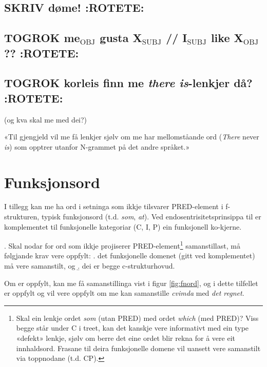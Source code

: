 \documentclass[11pt,a4paper,oneside,draft]{book}
\begin{document}
\subsection{\textbf{SKRIV} døme! \textbf{:ROTETE:}}
\label{sec-3.6.1}

\subsection{\textbf{TOGROK} me$_{\mathrm{OBJ}}$ gusta X$_{\mathrm{SUBJ}}$ // I$_{\mathrm{SUBJ}}$ like X$_{\mathrm{OBJ}}$ ?? \textbf{:ROTETE:}}
\label{sec-3.6.2}

\subsection{\textbf{TOGROK} korleis finn me \emph{there is}-lenkjer då? \textbf{:ROTETE:}}
\label{sec-3.6.3}

(og kva skal me med dei?)

«Til gjengjeld vil me få lenkjer sjølv om me har mellomståande ord
(\emph{There} never \emph{is}) som opptrer utanfor N-grammet på det andre
språket.»
\section{Funksjonsord}
\label{sec-3.7}

\label{SEC:fnord}
I tillegg kan me ha ord i setninga som ikkje tilsvarer PRED-element i
f-strukturen, typisk funksjonsord (t.d. \emph{som}, \emph{at}). Ved
endosentrisitetsprinsippa til \citet{bresnan2001lfs} er komplementet
til funksjonelle kategoriar (C, I, P) ein funksjonell ko-kjerne. 

\ex. \label{fnordkrav} Skal nodar for ord som ikkje projiserer
     PRED-element\footnote{Skal ein lenkje ordet \emph{som} (utan PRED) med ordet \emph{which} (med
 PRED)? Viss begge står under C i treet, kan det kanskje vere
 informativt med ein type «defekt» lenkje, sjølv om berre det eine
 ordet blir rekna for å vere eit innhaldsord. Frasane til deira
 funksjonelle domene vil uansett vere samanstilt via toppnodane
 (t.d. CP). } samanstillast, må følgjande krav vere oppfylt:
\a. det funksjonelle domenet (gitt ved komplementet) må vere
   samanstilt, og
\b. dei er begge c-strukturhovud.


Om \Last[a og -b] er oppfylt, kan me få samanstillinga vist i figur
\ref{fig:fnord}, og i dette tilfellet er \Last[b] oppfylt og \Last[a]
vil vere oppfylt om me kan samanstille \emph{cvimda} med \emph{det regnet}.
\end{document}
